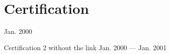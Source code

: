 \section{Certification}

    {Jan. 2000}

\cert%
    {Certification 2 without the link}
    {Jan. 2000 --- Jan. 2001}
